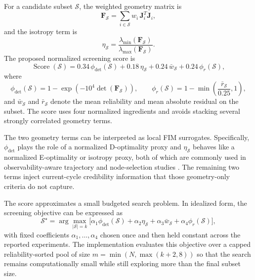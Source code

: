 \documentclass[drones,article,submit,pdftex,moreauthors]{Definitions/mdpi}
\begin{document}
For a candidate subset $\mathcal{S}$, the weighted geometry matrix is
\begin{equation}
\mathbf{F}_{\mathcal{S}}=\sum_{i\in\mathcal{S}} w_i\,\mathbf{J}_i^T\mathbf{J}_i,
\end{equation}
and the isotropy term is
\begin{equation}
\eta_{\mathcal{S}}=\frac{\lambda_{\min}(\mathbf{F}_{\mathcal{S}})}{\lambda_{\max}(\mathbf{F}_{\mathcal{S}})}.
\end{equation}
The proposed normalized screening score is
\begin{equation}
\operatorname{Score}(\mathcal{S})=
0.34\,\phi_{\det}(\mathcal{S})
+0.18\,\eta_{\mathcal{S}}
+0.24\,\bar{w}_{\mathcal{S}}
+0.24\,\phi_{r}(\mathcal{S}),
\end{equation}
where
\begin{equation}
\phi_{\det}(\mathcal{S}) = 1-\exp\!\left(-10^4\det(\mathbf{F}_{\mathcal{S}})\right),
\qquad
\phi_r(\mathcal{S}) = 1-\min\!\left(\frac{\bar{r}_{\mathcal{S}}}{0.25},1\right),
\end{equation}
and $\bar{w}_{\mathcal{S}}$ and $\bar{r}_{\mathcal{S}}$ denote the mean reliability and mean absolute residual on the subset. The score uses four normalized ingredients and avoids stacking several strongly correlated geometry terms.

The two geometry terms can be interpreted as local FIM surrogates. Specifically, $\phi_{\det}$ plays the role of a normalized D-optimality proxy and $\eta_{\mathcal{S}}$ behaves like a normalized E-optimality or isotropy proxy, both of which are commonly used in observability-aware trajectory and node-selection studies \cite{zou2024revisit,dogancay2024bayesian,chen2025variable}. The remaining two terms inject current-cycle credibility information that those geometry-only criteria do not capture.

The score approximates a small budgeted search problem. In idealized form, the screening objective can be expressed as
\begin{equation}
\mathcal{S}^{\star}=
\arg\max_{|\mathcal{S}|=k}
\Big[
\alpha_1 \phi_{\det}(\mathcal{S})
+\alpha_2 \eta_{\mathcal{S}}
+\alpha_3 \bar{w}_{\mathcal{S}}
+\alpha_4 \phi_r(\mathcal{S})
\Big],
\end{equation}
with fixed coefficients $\alpha_1,\dots,\alpha_4$ chosen once and then held constant across the reported experiments. The implementation evaluates this objective over a capped reliability-sorted pool of size $m=\min(N,\max(k+2,8))$ so that the search remains computationally small while still exploring more than the final subset size.
\end{document}
